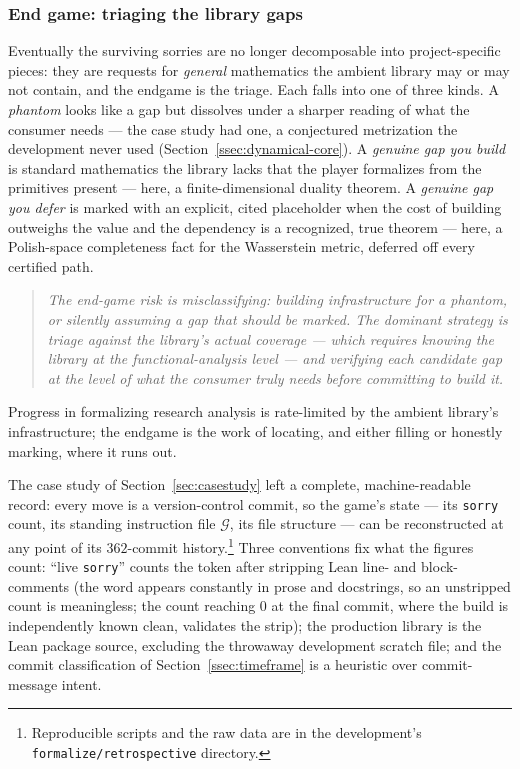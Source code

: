 \documentclass[11pt]{article}
\theoremstyle{plain}
\theoremstyle{definition}
\theoremstyle{remark}
\newcommand{\lean}[1]{\texttt{#1}}
\begin{document}
\subsubsection{End game: triaging the library gaps}
Eventually the surviving sorries are no longer decomposable into project-specific
pieces: they are requests for \emph{general} mathematics the ambient library may or
may not contain, and the endgame is the triage. Each falls into one of three kinds.
A \emph{phantom} looks like a gap but dissolves under a sharper reading of what the
consumer needs --- the case study had one, a conjectured metrization the
development never used (Section~\ref{ssec:dynamical-core}). A \emph{genuine gap you
build} is standard mathematics the library lacks that the player formalizes from
the primitives present --- here, a finite-dimensional duality theorem. A
\emph{genuine gap you defer} is marked with an explicit, cited placeholder when the
cost of building outweighs the value and the dependency is a recognized, true
theorem --- here, a Polish-space completeness fact for the Wasserstein metric,
deferred off every certified path.

\begin{quote}\itshape
The end-game risk is misclassifying: building infrastructure for a phantom, or
silently assuming a gap that should be marked. The dominant strategy is triage
against the library's actual coverage --- which requires knowing the library at
the functional-analysis level --- and verifying each candidate gap at the level
of what the consumer truly needs before committing to build it.
\end{quote}

Progress in formalizing research analysis is rate-limited by the ambient library's
infrastructure; the endgame is the work of locating, and either filling or honestly
marking, where it runs out.

\medskip\noindent
The case study of Section~\ref{sec:casestudy} left a complete, machine-readable record:
every move is a version-control commit, so the game's state --- its \lean{sorry} count, its
standing instruction file $\mathcal{G}$, its file structure --- can be reconstructed at any
point of its $362$-commit history.\footnote{Reproducible scripts and the raw data are in
the development's \lean{formalize/retrospective} directory.} Three conventions fix what
the figures count: ``live \lean{sorry}'' counts the token after stripping Lean line- and
block-comments (the word appears constantly in prose and docstrings, so an unstripped
count is meaningless; the count reaching $0$ at the final commit, where the build is
independently known clean, validates the strip); the production library is the Lean
package source, excluding the throwaway development scratch file; and the commit
classification of Section~\ref{ssec:timeframe} is a heuristic over commit-message intent.
\end{document}
